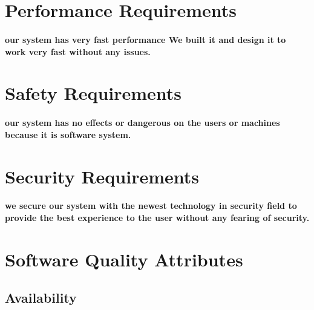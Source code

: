 \documentclass[../Psychological_system_web_application.tex]{subfiles}
\begin{document}
	
	
		\section{Performance Requirements}
		
			\paragraph{our system has very fast performance We built it and design it to work very fast without any issues.}
		
		\section{Safety Requirements}
		
			\paragraph{our system has no effects or dangerous on the users or machines because it is software system.}
		
		\section{Security Requirements}
		
			\paragraph{we secure our system with the newest technology in security field to provide the best experience to the user without any fearing of security.}
		
		\section{Software Quality Attributes}
		
			\subsection{Availability}
\end{document}
